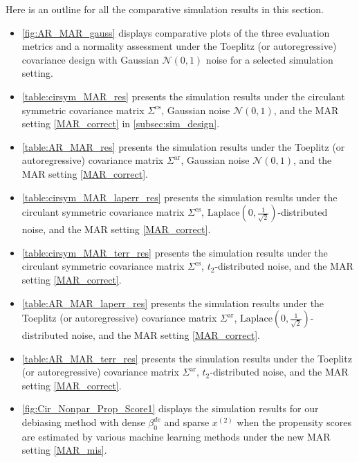 \documentclass[ejsv2,noshowframe]{imsart}
\theoremstyle{plain}
\theoremstyle{definition}
\theoremstyle{remark}
\begin{document}
Here is an outline for all the comparative simulation results in this section.
\begin{itemize}
	\item \autoref{fig:AR_MAR_gauss} displays comparative plots of the three evaluation metrics and a normality assessment under the Toeplitz (or autoregressive) covariance design with Gaussian $\mathcal{N}(0,1)$ noise for a selected simulation setting.
	
	\item \autoref{table:cirsym_MAR_res} presents the simulation results under the circulant symmetric covariance matrix $\Sigma^{\mathrm{cs}}$, Gaussian noise $\mathcal{N}(0,1)$, and the MAR setting \eqref{MAR_correct} in \autoref{subsec:sim_design}.
	
	\item \autoref{table:AR_MAR_res} presents the simulation results under the Toeplitz (or autoregressive) covariance matrix $\Sigma^{\mathrm{ar}}$, Gaussian noise $\mathcal{N}(0,1)$, and the MAR setting \eqref{MAR_correct}.
	
	\item \autoref{table:cirsym_MAR_laperr_res} presents the simulation results under the circulant symmetric covariance matrix $\Sigma^{\mathrm{cs}}$, $\mathrm{Laplace}\left(0, \frac{1}{\sqrt{2}}\right)$-distributed noise, and the MAR setting \eqref{MAR_correct}.
	
	\item \autoref{table:cirsym_MAR_terr_res} presents the simulation results under the circulant symmetric covariance matrix $\Sigma^{\mathrm{cs}}$, $t_2$-distributed noise, and the MAR setting \eqref{MAR_correct}.
	
	\item \autoref{table:AR_MAR_laperr_res} presents the simulation results under the Toeplitz (or autoregressive) covariance matrix $\Sigma^{\mathrm{ar}}$, $\mathrm{Laplace}\left(0, \frac{1}{\sqrt{2}}\right)$-distributed noise, and the MAR setting \eqref{MAR_correct}.
	
	\item \autoref{table:AR_MAR_terr_res} presents the simulation results under the Toeplitz (or autoregressive) covariance matrix $\Sigma^{\mathrm{ar}}$, $t_2$-distributed noise, and the MAR setting \eqref{MAR_correct}.
	
	\item \autoref{fig:Cir_Nonpar_Prop_Score1} displays the simulation results for our debiasing method with dense $\beta_0^{de}$ and sparse $x^{(2)}$ when the propensity scores are estimated by various machine learning methods under the new MAR setting \eqref{MAR_mis}.
	

\end{itemize}
\end{document}
